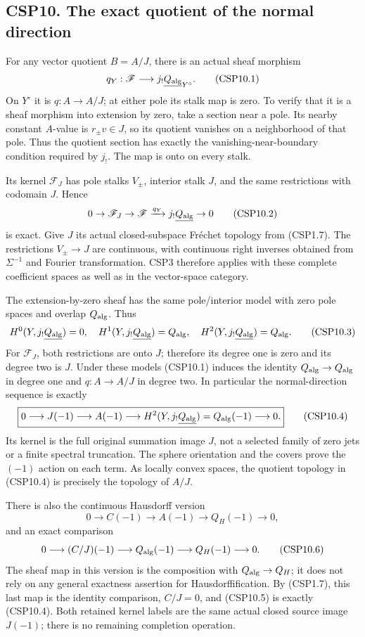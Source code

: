 \subsection{CSP10. The exact quotient of the normal
direction}\label{csp10.-the-exact-quotient-of-the-normal-direction}

For any vector quotient \(B=A/J\), there is an actual sheaf morphism \[
q_Y:\mathscr F\longrightarrow j_!\underline{Q_{\rm alg}}_{Y^\circ}.
\tag{CSP10.1}
\] On \(Y^\circ\) it is \(q:A\to A/J\); at either pole its stalk map is
zero. To verify that it is a sheaf morphism into extension by zero, take
a section near a pole. Its nearby constant \(A\)-value is
\(r_\pm v\in J\), so its quotient vanishes on a neighborhood of that
pole. Thus the quotient section has exactly the vanishing-near-boundary
condition required by \(j_!\). The map is onto on every stalk.

Its kernel \(\mathscr F_J\) has pole stalks \(V_\pm\), interior stalk
\(J\), and the same restrictions with codomain \(J\). Hence \[
0\to\mathscr F_J\to\mathscr F
\xrightarrow{q_Y}j_!\underline{Q_{\rm alg}}\to0
\tag{CSP10.2}
\] is exact. Give \(J\) its actual closed-subspace Fréchet topology from
(CSP1.7). The restrictions \(V_\pm\to J\) are continuous, with
continuous right inverses obtained from \(\Sigma^{-1}\) and Fourier
transformation. CSP3 therefore applies with these complete coefficient
spaces as well as in the vector-space category.

The extension-by-zero sheaf has the same pole/interior model with zero
pole spaces and overlap \(Q_{\rm alg}\). Thus \[
H^0(Y,j_!\underline{Q_{\rm alg}})=0,\quad
H^1(Y,j_!\underline{Q_{\rm alg}})=Q_{\rm alg},\quad
H^2(Y,j_!\underline{Q_{\rm alg}})=Q_{\rm alg}.
\tag{CSP10.3}
\] For \(\mathscr F_J\), both restrictions are onto \(J\); therefore its
degree one is zero and its degree two is \(J\). Under these models
(CSP10.1) induces the identity \(Q_{\rm alg}\to Q_{\rm alg}\) in degree
one and \(q:A\to A/J\) in degree two. In particular the normal-direction
sequence is exactly \[
\boxed{
0\longrightarrow J(-1)\longrightarrow A(-1)
\longrightarrow H^2(Y,j_!\underline{Q_{\rm alg}})
=Q_{\rm alg}(-1)\longrightarrow0.
}
\tag{CSP10.4}
\] Its kernel is the full original summation image \(J\), not a selected
family of zero jets or a finite spectral truncation. The sphere
orientation and the covers prove the \((-1)\) action on each term. As
locally convex spaces, the quotient topology in (CSP10.4) is precisely
the topology of \(A/J\).

There is also the continuous Hausdorff version \[
0\longrightarrow C(-1)\longrightarrow A(-1)
\longrightarrow Q_H(-1)\longrightarrow0,
\tag{CSP10.5}
\] and an exact comparison \[
0\longrightarrow (C/J)(-1)\longrightarrow Q_{\rm alg}(-1)
\longrightarrow Q_H(-1)\longrightarrow0.
\tag{CSP10.6}
\] The sheaf map in this version is the composition with
\(Q_{\rm alg}\to Q_H\); it does not rely on any general exactness
assertion for Hausdorffification. By (CSP1.7), this last map is the
identity comparison, \(C/J=0\), and (CSP10.5) is exactly (CSP10.4). Both
retained kernel labels are the same actual closed source image
\(J(-1)\); there is no remaining completion operation.

